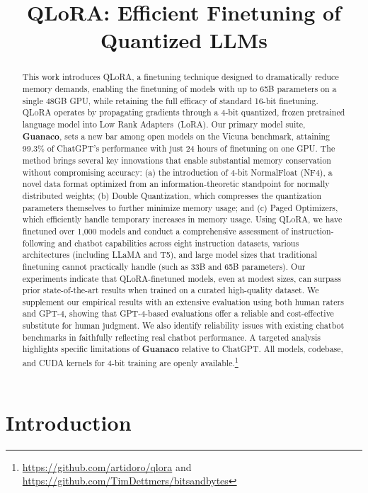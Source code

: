 \title{QLoRA: Efficient Finetuning of Quantized LLMs}

\begin{abstract}
This work introduces \textsc{QLoRA}, a finetuning technique designed to dramatically reduce memory demands, enabling the finetuning of models with up to 65B parameters on a single 48GB GPU, while retaining the full efficacy of standard 16-bit finetuning. \textsc{QLoRA} operates by propagating gradients through a 4-bit quantized, frozen pretrained language model into Low Rank Adapters~(LoRA). Our primary model suite, \textbf{Guanaco}, sets a new bar among open models on the Vicuna benchmark, attaining 99.3\% of ChatGPT’s performance with just 24 hours of finetuning on one GPU. The method brings several key innovations that enable substantial memory conservation without compromising accuracy: (a) the introduction of 4-bit NormalFloat (NF4), a novel data format optimized from an information-theoretic standpoint for normally distributed weights; (b) Double Quantization, which compresses the quantization parameters themselves to further minimize memory usage; and (c) Paged Optimizers, which efficiently handle temporary increases in memory usage. Using \textsc{QLoRA}, we have finetuned over 1,000 models and conduct a comprehensive assessment of instruction-following and chatbot capabilities across eight instruction datasets, various architectures (including LLaMA and T5), and large model sizes that traditional finetuning cannot practically handle (such as 33B and 65B parameters). Our experiments indicate that QLoRA-finetuned models, even at modest sizes, can surpass prior state-of-the-art results when trained on a curated high-quality dataset. We supplement our empirical results with an extensive evaluation using both human raters and GPT-4, showing that GPT-4-based evaluations offer a reliable and cost-effective substitute for human judgment. We also identify reliability issues with existing chatbot benchmarks in faithfully reflecting real chatbot performance. A targeted analysis highlights specific limitations of \textbf{Guanaco} relative to ChatGPT. All models, codebase, and CUDA kernels for 4-bit training are openly available.\footnote{\url{https://github.com/artidoro/qlora} and \url{https://github.com/TimDettmers/bitsandbytes}}
\end{abstract}

\section{Introduction}


